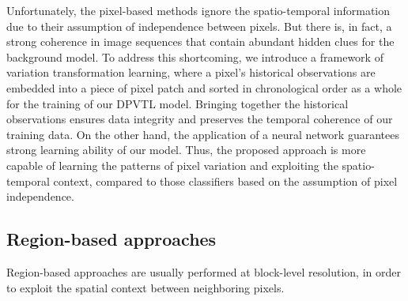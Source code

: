 \documentclass[journal]{IEEEtran}
\begin{document}
Unfortunately,
the pixel-based methods ignore the spatio-temporal information due to their assumption of independence between pixels.
But there is, in fact, a strong coherence in image sequences that contain abundant hidden clues for the background model. 
%
To address this shortcoming, we introduce a framework of variation transformation learning, 
where a pixel's historical observations are embedded into a piece of pixel patch and sorted in chronological order as a whole for the training of our DPVTL model.
Bringing together the historical observations ensures data integrity and preserves the temporal coherence of our training data. 
On the other hand, the application of a neural network guarantees strong learning ability of our model.
Thus, the proposed approach is more capable of learning the patterns of pixel variation and exploiting the spatio-temporal context, compared to those classifiers based on the assumption of pixel independence. 
%
%
%
%
%
%
\subsection{Region-based approaches}
Region-based approaches are usually performed at block-level resolution, in order to exploit the spatial context between neighboring pixels.
%
\end{document}
